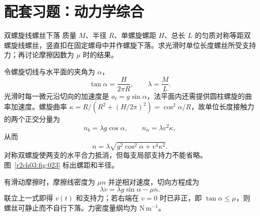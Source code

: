 \section{配套习题：动力学综合}

\begin{practicebox}{双螺旋线螺丝下落}
质量 $M$、半径 $R$、单螺旋螺距 $H$、总长 $L$ 的匀质对称等距双螺旋线螺丝，竖直扣在固定螺母中并作螺旋下落。求光滑时单位长度螺丝所受支持力；再讨论摩擦因数为 $\mu$ 时的结果。
\label{r2ch03:pr:007}
\begin{solution}
令螺旋切线与水平面的夹角为 $\alpha$，
\[
 \tan\alpha=\frac{H}{2\pi R},\qquad \lambda=\frac ML.
\]
光滑时每一微元沿切向的加速度是 $a_t=g\sin\alpha$，法平面内还需提供圆柱螺旋的曲率加速度。螺旋曲率
$\kappa=R/(R^2+(H/2\pi)^2)=\cos^2\alpha/R$，故单位长度接触力的两个正交分量为
\[
 n_b=\lambda g\cos\alpha,\qquad
 n_n=\lambda v^2\kappa,
\]
从而
\[
 \boxed{n=\lambda\sqrt{g^2\cos^2\alpha+v^4\kappa^2}}.
\]
对称双螺旋使两支的水平合力抵消，但每支局部支持力不能省略。图~\ref{r2ch03:fig:023} 标出螺距和半径。

有滑动摩擦时，摩擦线密度为 $\mu n$ 并逆相对速度，切向方程成为
\[
 \lambda\dot v=\lambda g\sin\alpha-\mu n.
\]
联立上一式即得 $v(t)$ 和支持力；若右端在 $v=0$ 时已非正，即
$\tan\alpha\le\mu$，则螺丝可静止而不自行下落。力密度量纲均为 $\mathrm N\,\mathrm m^{-1}$。
\figDoubleHelix
\end{solution}
\end{practicebox}

